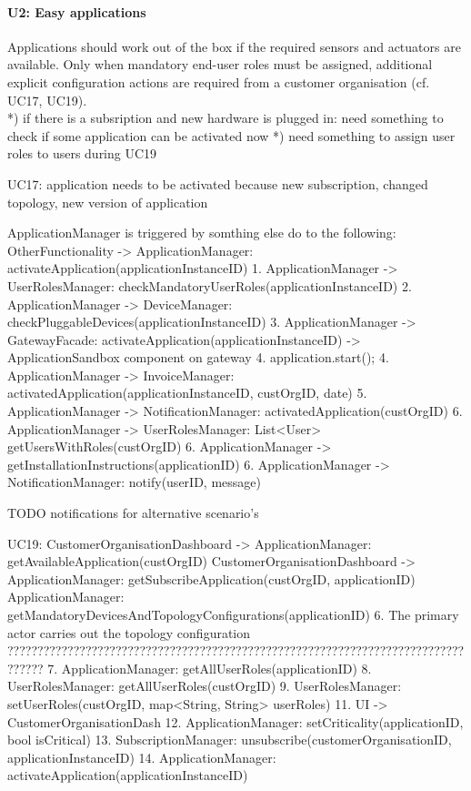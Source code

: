     \paragraph{U2: Easy applications}
        Applications should work out of the box if the required sensors and
        actuators are available. Only when mandatory end-user roles must be
        assigned, additional explicit configuration actions are required
        from a customer organisation (cf. UC17, UC19). \\
        *) if there is a subsription and new hardware is plugged in: need something to check
           if some application can be activated now
        *) need something to assign user roles to users during UC19

        UC17:
            application needs to be activated because new subscription, changed topology, new version of application

            ApplicationManager is triggered by somthing else do to the following: OtherFunctionality -> ApplicationManager: activateApplication(applicationInstanceID)
            1. ApplicationManager -> UserRolesManager: checkMandatoryUserRoles(applicationInstanceID)
            2. ApplicationManager -> DeviceManager: checkPluggableDevices(applicationInstanceID)
            3. ApplicationManager -> GatewayFacade: activateApplication(applicationInstanceID) -> ApplicationSandbox component on gateway
            4. application.start();
            4. ApplicationManager -> InvoiceManager: activatedApplication(applicationInstanceID, custOrgID, date)
            5. ApplicationManager -> NotificationManager: activatedApplication(custOrgID)
            6. ApplicationManager -> UserRolesManager: List<User> getUsersWithRoles(custOrgID)
            6. ApplicationManager -> getInstallationInstructions(applicationID)
            6. ApplicationManager -> NotificationManager: notify(userID, message)

            TODO notifications for alternative scenario's

        UC19:
            CustomerOrganisationDashboard -> ApplicationManager: getAvailableApplication(custOrgID)
            CustomerOrganisationDashboard -> ApplicationManager: getSubscribeApplication(custOrgID, applicationID)
                ApplicationManager: getMandatoryDevicesAndTopologyConfigurations(applicationID)
            6. The primary actor carries out the topology configuration ??????????????????????????????????????????????????????????????????????????????????
            7. ApplicationManager: getAllUserRoles(applicationID)
            8. UserRolesManager: getAllUserRoles(custOrgID)
            9. UserRolesManager: setUserRoles(custOrgID, map<String, String> userRoles)
            11. UI -> CustomerOrganisationDash
            12. ApplicationManager: setCriticality(applicationID, bool isCritical)
            13. SubscriptionManager: unsubscribe(customerOrganisationID, applicationInstanceID)
            14. ApplicationManager: activateApplication(applicationInstanceID)

